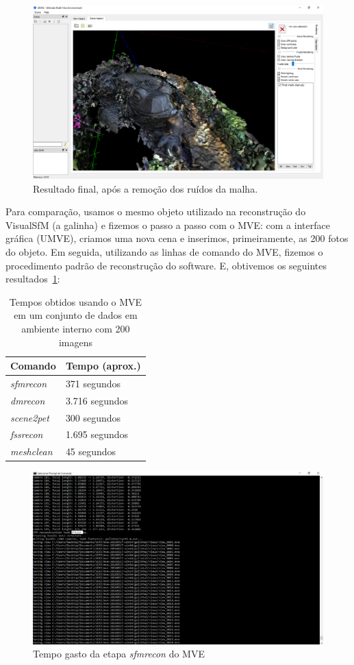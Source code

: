 \begin{figure}[!h]
	\centering
	\includegraphics[width=1\linewidth]{figs/mvemeshclean.png}
	\caption{%
	Resultado final, após a remoção dos ruídos da malha.
	}\label{fig:MVEMeshClean}
\end{figure} 

Para comparação, usamos o mesmo objeto utilizado na reconstrução do VisualSfM (a galinha) e fizemos o passo a passo com o MVE: com a interface gráfica (UMVE), criamos uma nova cena e inserimos, primeiramente, as 200 fotos do objeto. Em seguida, utilizando as linhas de comando do MVE, fizemos o procedimento padrão de reconstrução do software. E, obtivemos os seguintes resultados~\ref{tab:galinha200mve}:

\begin{table}[!h]
\centering
\caption{Tempos obtidos usando o MVE em um conjunto de dados em ambiente interno com 200 imagens}
\label{tab:galinha200mve}
\begin{tabular}{|l|l|}
\hline
Comando            & Tempo (aprox.)         \\ \hline
\emph{sfmrecon}  & 371 segundos   \\ \hline
\emph{dmrecon}   & 3.716 segundos \\ \hline
\emph{scene2pet} & 300 segundos   \\ \hline
\emph{fssrecon}  & 1.695 segundos \\ \hline
\emph{meshclean} & 45 segundos    \\ \hline
\end{tabular}
\end{table}

\begin{figure}[!h]
	\centering
	\includegraphics[width=0.5\linewidth]{figs/galinhalongesfmreconmve.png}
	\caption{%
	Tempo gasto da etapa \emph{sfmrecon} do MVE
	}\label{fig:sfmrecon1}
\end{figure}


